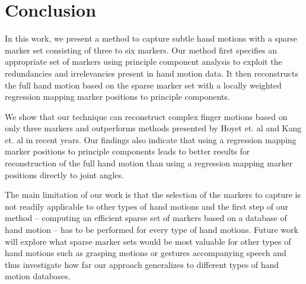 \section{Conclusion}

In this work, we present a method to capture subtle hand motions with a sparse marker set consisting of three to six markers. Our method first specifies an appropriate set of markers using principle component analysis to exploit the redundancies and irrelevancies present in hand motion data. It then reconstructs the full hand motion based on the sparse marker set with a locally weighted regression mapping marker positions to principle components. 

We show that our technique can reconstruct complex finger motions based on only three markers and outperforms methods presented by Hoyet et. al  and Kang et. al  in recent years. Our findings also indicate that using a regression mapping marker positions to principle components leads to better results for reconstruction of the full hand motion than using a regression mapping marker positions directly to joint angles. 

The main limitation of our work is that the selection of the markers to capture is not readily applicable to other types of hand motions and the first step of our method -- computing an efficient sparse set of markers based on a database of hand motion -- has to be performed for every type of hand motions. Future work will explore what sparse marker sets would be most valuable for other types of hand motions such as grasping motions or gestures accompanying speech and thus investigate how far our approach generalizes to different types of hand motion databases.

